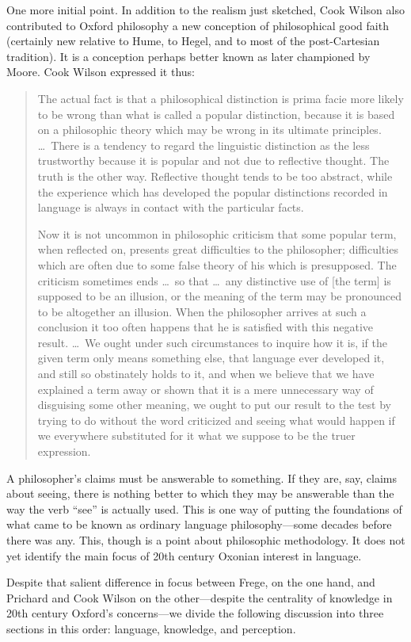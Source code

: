 One more initial point. In addition to the realism just sketched, Cook Wilson also contributed to Oxford philosophy a new conception of philosophical good faith (certainly new relative to Hume, to Hegel, and to most of the post-Cartesian tradition). It is a conception perhaps better known as later championed by Moore. Cook Wilson expressed it thus:
\begin{quotation}
	\noindent The actual fact is that a philosophical distinction is prima facie more likely to be wrong than what is called a popular distinction, because it is based on a philosophic theory which may be wrong in its ultimate principles. \ldots\ There is a tendency to regard the linguistic distinction as the less trustworthy because it is popular and not due to reflective thought. The truth is the other way. Reflective thought tends to be too abstract, while the experience which has developed the popular distinctions recorded in language is always in contact with the particular facts.
	
	Now it is not uncommon in philosophic criticism that some popular term, when reflected on, presents great difficulties to the philosopher; difficulties which are often due to some false theory of his which is presupposed. The criticism sometimes ends \ldots\ so that \ldots\ any distinctive use of [the term] is supposed to be an illusion, or the meaning of the term may be pronounced to be altogether an illusion. When the philosopher arrives at such a conclusion it too often happens that he is satisfied with this negative result. \ldots\ We ought under such circumstances to inquire how it is, if the given term only means something else, that language ever developed it, and still so obstinately holds to it, and when we believe that we have explained a term away or shown that it is a mere unnecessary way of disguising some other meaning, we ought to put our result to the test by trying to do without the word criticized and seeing what would happen if we everywhere substituted for it what we suppose to be the truer expression. \citep[875]{Cook-Wilson:1926sf}
\end{quotation}
A philosopher's claims must be answerable to something. If they are, say, claims about seeing, there is nothing better to which they may be answerable than the way the verb ``see'' is actually used. This is one way of putting the foundations of what came to be known as ordinary language philosophy---some decades before there was any. This, though is a point about philosophic methodology. It does not yet identify the main focus of 20th century Oxonian interest in language. 

Despite that salient difference in focus between Frege, on the one hand, and Prichard and Cook Wilson on the other---despite the centrality of knowledge in 20th century Oxford’s concerns---we divide the following discussion into three sections in this order: language, knowledge, and perception.

\nocite{Russell:1985lk}

